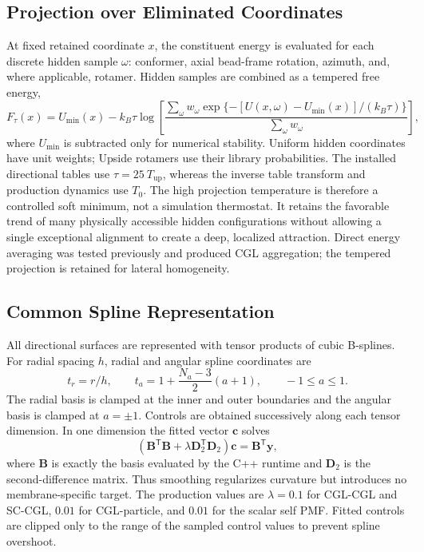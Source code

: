 \documentclass{article}
\begin{document}
\subsection{Projection over Eliminated Coordinates}

At fixed retained coordinate $x$, the constituent energy is evaluated for
each discrete hidden sample $\omega$: conformer, axial bead-frame rotation,
azimuth, and, where applicable, rotamer.  Hidden samples are combined as a
tempered free energy,
\begin{equation}
F_{\tau}(x)=U_{\min}(x)-k_B\tau\log\left[
\frac{\sum_{\omega}w_{\omega}
\exp\{-[U(x,\omega)-U_{\min}(x)]/(k_B\tau)\}}
{\sum_{\omega}w_{\omega}}\right],
\label{eq:tempered_projection}
\end{equation}
where $U_{\min}$ is subtracted only for numerical stability.  Uniform hidden
coordinates have unit weights; Upside rotamers use their library
probabilities.  The installed directional tables use
$\tau=25~T_{\mathrm{up}}$, whereas the inverse table transform and production
dynamics use $T_0$.  The high projection temperature is therefore a controlled
soft minimum, not a simulation thermostat.  It retains the favorable trend of
many physically accessible hidden configurations without allowing a single
exceptional alignment to create a deep, localized attraction.  Direct energy
averaging was tested previously and produced CGL aggregation; the tempered
projection is retained for lateral homogeneity.

\subsection{Common Spline Representation}

All directional surfaces are represented with tensor products of cubic
B-splines.  For radial spacing $h$, radial and angular spline coordinates are
\begin{equation}
t_r=r/h,\qquad
t_a=1+\frac{N_a-3}{2}(a+1),\qquad -1\leq a\leq1.
\label{eq:spline_coordinates}
\end{equation}
The radial basis is clamped at the inner and outer boundaries and the angular
basis is clamped at $a=\pm1$.  Controls are obtained successively along each
tensor dimension.  In one dimension the fitted vector $\mathbf c$ solves
\begin{equation}
\left(\mathbf B^{\mathsf T}\mathbf B
+\lambda\mathbf D_2^{\mathsf T}\mathbf D_2\right)\mathbf c
=\mathbf B^{\mathsf T}\mathbf y,
\label{eq:spline_fit}
\end{equation}
where $\mathbf B$ is exactly the basis evaluated by the C++ runtime and
$\mathbf D_2$ is the second-difference matrix.  Thus smoothing regularizes
curvature but introduces no membrane-specific target.  The production values
are $\lambda=0.1$ for CGL-CGL and SC-CGL, $0.01$ for CGL-particle, and $0.01$
for the scalar self PMF.  Fitted controls are clipped only to the range of the
sampled control values to prevent spline overshoot.
\end{document}
